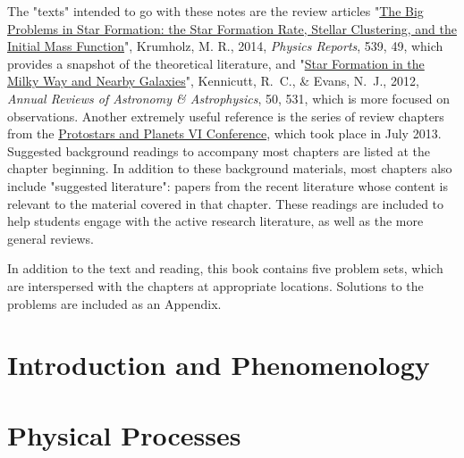 \documentclass[twoside]{tex/tufte-book} %
\begin{document}
The "texts" intended to go with these notes are the review articles "\href{http://adsabs.harvard.edu/abs/2014PhR...539...49K}{The Big Problems in Star Formation: the Star Formation Rate, Stellar Clustering, and the Initial Mass Function}", Krumholz, M. R., 2014, \textit{Physics Reports}, 539, 49, which provides a snapshot of the theoretical literature, and "\href{http://adsabs.harvard.edu/abs/2012ARA\%26A..50..531K}{Star Formation in the Milky Way and Nearby Galaxies}", Kennicutt, R.~C., \& Evans, N.~J., 2012, \textit{Annual Reviews of Astronomy \& Astrophysics}, 50, 531, which is more focused on observations. Another extremely useful reference is the series of review chapters from the \href{http://www.mpia.de/homes/ppvi/}{Protostars and Planets VI Conference}, which took place in July 2013. Suggested background readings to accompany most chapters are listed at the chapter beginning. In addition to these background materials, most chapters also include "suggested literature": papers from the recent literature whose content is relevant to the material covered in that chapter. These readings are included to help students engage with the active research literature, as well as the more general reviews.

In addition to the text and reading, this book contains five problem sets, which are interspersed with the chapters at appropriate locations. Solutions to the problems are included as an Appendix.


\setcounter{secnumdepth}{3}

\mainmatter


\part{Introduction and Phenomenology}




\part{Physical Processes}







\end{document}
